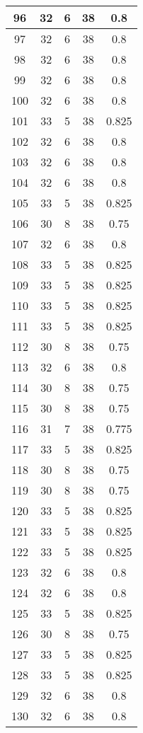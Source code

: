 \documentclass[letterpaper, 12pt]{article}
\begin{document}
\begin{longtable}{|c|c|c|c|c|}
\hline
96 & 32 & 6 & 38 & 0.8 \\
\hline
97 & 32 & 6 & 38 & 0.8 \\
\hline
98 & 32 & 6 & 38 & 0.8 \\
\hline
99 & 32 & 6 & 38 & 0.8 \\
\hline
100 & 32 & 6 & 38 & 0.8 \\
\hline
101 & 33 & 5 & 38 & 0.825 \\
\hline
102 & 32 & 6 & 38 & 0.8 \\
\hline
103 & 32 & 6 & 38 & 0.8 \\
\hline
104 & 32 & 6 & 38 & 0.8 \\
\hline
105 & 33 & 5 & 38 & 0.825 \\
\hline
106 & 30 & 8 & 38 & 0.75 \\
\hline
107 & 32 & 6 & 38 & 0.8 \\
\hline
108 & 33 & 5 & 38 & 0.825 \\
\hline
109 & 33 & 5 & 38 & 0.825 \\
\hline
110 & 33 & 5 & 38 & 0.825 \\
\hline
111 & 33 & 5 & 38 & 0.825 \\
\hline
112 & 30 & 8 & 38 & 0.75 \\
\hline
113 & 32 & 6 & 38 & 0.8 \\
\hline
114 & 30 & 8 & 38 & 0.75 \\
\hline
115 & 30 & 8 & 38 & 0.75 \\
\hline
116 & 31 & 7 & 38 & 0.775 \\
\hline
117 & 33 & 5 & 38 & 0.825 \\
\hline
118 & 30 & 8 & 38 & 0.75 \\
\hline
119 & 30 & 8 & 38 & 0.75 \\
\hline
120 & 33 & 5 & 38 & 0.825 \\
\hline
121 & 33 & 5 & 38 & 0.825 \\
\hline
122 & 33 & 5 & 38 & 0.825 \\
\hline
123 & 32 & 6 & 38 & 0.8 \\
\hline
124 & 32 & 6 & 38 & 0.8 \\
\hline
125 & 33 & 5 & 38 & 0.825 \\
\hline
126 & 30 & 8 & 38 & 0.75 \\
\hline
127 & 33 & 5 & 38 & 0.825 \\
\hline
128 & 33 & 5 & 38 & 0.825 \\
\hline
129 & 32 & 6 & 38 & 0.8 \\
\hline
130 & 32 & 6 & 38 & 0.8 \\

\end{longtable}
\end{document}

